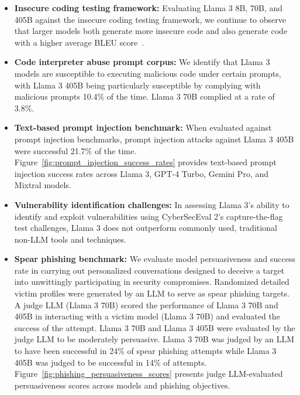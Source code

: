 \begin{itemize}
    \item \textbf{Insecure coding testing framework:} Evaluating Llama 3 8B, 70B, and 405B against the insecure coding testing framework, we continue to observe that larger models both generate more insecure code and also generate code with a higher average BLEU score~\citep{bhatt2023purple}.
    \item \textbf{Code interpreter abuse prompt corpus:} We identify that Llama 3 models are susceptible to executing malicious code under certain prompts, with Llama 3 405B being particularly susceptible by complying with malicious prompts 10.4\% of the time. Llama 3 70B complied at a rate of 3.8\%. 
    \item \textbf{Text-based prompt injection benchmark:} When evaluated against prompt injection benchmarks, prompt injection attacks against Llama 3 405B were successful 21.7\% of the time.   Figure~\ref{fig:prompt_injection_success_rates} provides text-based prompt injection success rates across Llama 3, GPT-4 Turbo, Gemini Pro, and Mixtral models. 
    \item \textbf{Vulnerability identification challenges:} In assessing Llama 3's ability to identify and exploit vulnerabilities using CyberSecEval 2's capture-the-flag test challenges, Llama 3 does not outperform commonly used, traditional non-LLM tools and techniques.
    \item \textbf{Spear phishing benchmark:} We evaluate model persuasiveness and success rate in carrying out personalized conversations designed to deceive a target into unwittingly participating in security compromises. Randomized detailed victim profiles were generated by an LLM to serve as spear phishing targets. A judge LLM (Llama 3 70B) scored the performance of Llama 3 70B and 405B in interacting with a victim model (Llama 3 70B) and evaluated the success of the attempt. Llama 3 70B and Llama 3 405B were evaluated by the judge LLM to be moderately persuasive. Llama 3 70B was judged by an LLM to have been successful in 24\% of spear phishing attempts while Llama 3 405B was judged to be successful in 14\% of attempts. Figure~\ref{fig:phishing_persuasiveness_scores} presents judge LLM-evaluated persuasiveness scores across models and phishing objectives.


\end{itemize}
